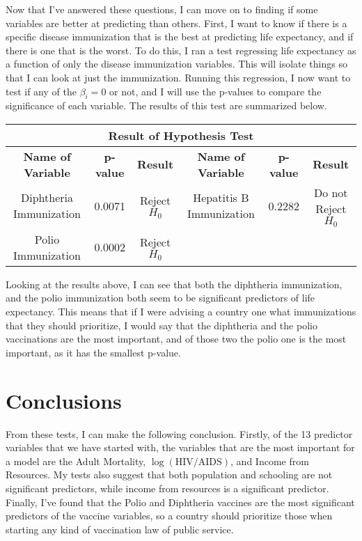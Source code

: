 \documentclass{article}
\renewcommand{\l}{\left}
\renewcommand{\r}{\right}
\begin{document}
	Now that I've answered these questions, I can move on to finding if some variables are better at predicting than others. First, I want to know if there is a specific disease immunization that is the best at predicting life expectancy, and if there is one that is the worst. To do this, I ran a test regressing life expectancy as a function of only the disease immunization variables. This will isolate things so that I can look at just the immunization. Running this regression, I now want to test if any of the $\beta_i = 0$ or not, and I will use the p-values to compare the significance of each variable. The results of this test are summarized below.
\begin{table}[ht]
\centering
\footnotesize
\begin{tabular}{|c|c|c|c|c|c|}
\hline
\multicolumn{6}{|c|}{\textbf{Result of Hypothesis Test}} \\ \hline
\textbf{Name of Variable} & \textbf{p-value} & \textbf{Result} & \textbf{Name of Variable} & \textbf{p-value} & \textbf{Result} \\ \hline
Diphtheria Immunization & 0.0071 & Reject $H_0$  & Hepatitis B Immunization & 0.2282 & Do not Reject $H_0$  \\ \hline
Polio Immunization & 0.0002 & Reject $H_0$ &  &  &  \\ \hline
\end{tabular}
\end{table}

Looking at the results above, I can see that both the diphtheria immunization, and the polio immunization both seem to be significant predictors of life expectancy. This means that if I were advising a country one what immunizations that they should prioritize, I would say that the diphtheria and the polio vaccinations are the most important, and of those two the polio one is the most important, as it has the smallest p-value.

\section*{Conclusions}
	From these tests, I can make the following conclusion. Firstly, of the 13 predictor variables that we have started with, the variables that are the most important for a model are the Adult Mortality, $\log\l(\text{HIV/AIDS}\r)$, and Income from Resources. My tests also suggest that both population and schooling are not significant predictors, while income from resources is a significant predictor. Finally, I've found that the Polio and Diphtheria vaccines are the most significant predictors of the vaccine variables, so a country should prioritize those when starting any kind of vaccination law of public service.
	\newpage
\end{document}
